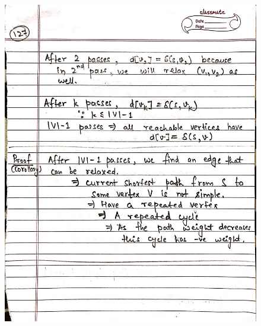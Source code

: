 \begin{figure}[H]
    \centering
    \includegraphics[width=16cm, height=21cm]{"./MIT-6.006/MIT-6006-127"}
\end{figure}
\newpage
